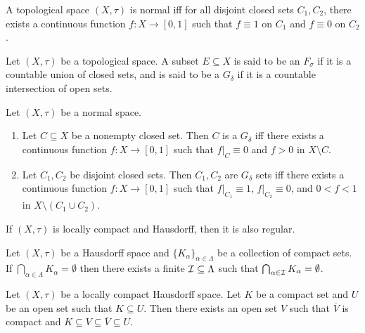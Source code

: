 \documentclass{techreport}
\begin{document}
\begin{theorem}\label{The:Urysohn}
	A topological space $(X,\tau)$ is normal iff for all disjoint closed sets $C_1,C_2$, there exists a continuous function $f:X \to [0,1]$ such that $f \equiv 1$ on $C_1$ and $f \equiv 0$ on $C_2$.
\end{theorem}

\begin{definition}\label{De:FsigmaGdelta}
	Let $(X,\tau)$ be a topological space.
	A subset $E \subseteq X$ is said to be an $F_\sigma$ if it is a countable union of closed sets, and is said to be a $G_\delta$ if it is a countable intersection of open sets.
\end{definition}

\begin{proposition}\label{Prop:GdeltaStrongerSeparation}
	Let $(X,\tau)$ be a normal space.
	\begin{enumerate}
		\item Let $C \subseteq X$ be a nonempty closed set.
		Then $C$ is a $G_\delta$ iff there exists a continuous function $f : X \to [0,1]$ such that $f|_C \equiv 0$ and $f > 0$ in $X \setminus C$.
		\item Let $C_1,C_2$ be disjoint closed sets.
		Then $C_1,C_2$ are $G_\delta$ sets iff there exists a continuous function $f: X \to [0,1]$ such that $f|_{C_1} \equiv 1$, $f|_{C_2} \equiv 0$, and $0 < f < 1$ in $X \setminus (C_1 \cup C_2)$.
	\end{enumerate}
\end{proposition}

\begin{lemma}\label{Lem:LocCompT2ImplyRegular}
	If $(X,\tau)$ is locally compact and Hausdorff, then it is also regular.
\end{lemma}

\begin{lemma}\label{Lem:T2CompactEmptyInterThenFinteEmptyInter}
	Let $(X,\tau)$ be a Hausdorff space and $\{K_\alpha\}_{\alpha \in \Lambda}$ be a collection of compact sets.
	If $\bigcap_{\alpha \in \Lambda} K_\alpha = \emptyset$ then there exists a finite $\mathcal{I} \subseteq \Lambda$ such that $\bigcap_{\alpha \in \mathcal{I}} K_\alpha = \emptyset$.
\end{lemma}

\begin{lemma}\label{Lem:LocCompT2ThenNeighborContainCompactClosure}
	Let $(X,\tau)$ be a locally compact Hausdorff space.
	Let $K$ be a compact set and $U$ be an open set such that $K \subseteq U$.
	Then there exists an open set $V$ such that $\overline{V}$ is compact and $K \subseteq V \subseteq \overline{V} \subseteq U$.
\end{lemma}
\end{document}

